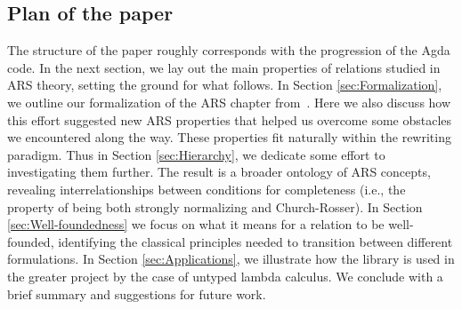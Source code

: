 
\subsection{Plan of the paper}

The structure of the paper roughly corresponds with the progression of the Agda code.
In the next section, we lay out the main properties of relations studied in ARS theory,
setting the ground for what follows.  In Section \ref{sec:Formalization}, we
outline our formalization of the ARS chapter from~\cite{Terese}.
Here we also discuss how this effort suggested new ARS properties that helped us overcome some obstacles we encountered along the way.  These properties fit naturally within the rewriting paradigm.  Thus in Section \ref{sec:Hierarchy}, we dedicate some effort to investigating them further.  The result is a broader ontology of ARS concepts, revealing interrelationships between conditions for completeness (i.e., the property of being both strongly normalizing and Church-Rosser).  In Section \ref{sec:Well-foundedness} we focus on what it means for a relation to be well-founded, identifying the classical principles needed to transition between different formulations.
In Section \ref{sec:Applications}, we illustrate how the library is used in the greater project by the case of untyped lambda calculus.
We conclude with a brief summary and suggestions for future work.

